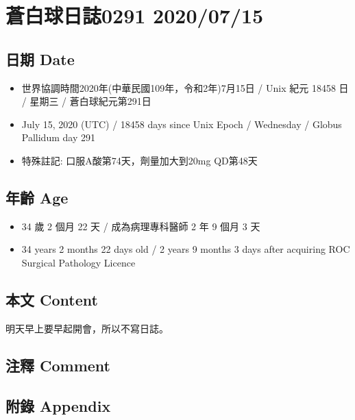 \documentclass[a5paper, 11pt
]{book}
\providecommand{\tightlist}{%
  \setlength{\itemsep}{0pt}\setlength{\parskip}{0pt}}
\begin{document}
\hypertarget{ux84bcux767dux7403ux65e5ux8a8c0291-20200715}{%
\section{蒼白球日誌0291
2020/07/15}\label{ux84bcux767dux7403ux65e5ux8a8c0291-20200715}}

\hypertarget{ux65e5ux671f-date-39}{%
\subsection{日期 Date}\label{ux65e5ux671f-date-39}}

\begin{itemize}
\tightlist
\item
  世界協調時間2020年(中華民國109年，令和2年)7月15日 / Unix 紀元 18458 日
  / 星期三 / 蒼白球紀元第291日
\item
  July 15, 2020 (UTC) / 18458 days since Unix Epoch / Wednesday / Globus
  Pallidum day 291
\item
  特殊註記: 口服A酸第74天，劑量加大到20mg QD第48天
\end{itemize}

\hypertarget{ux5e74ux9f61-age-39}{%
\subsection{年齡 Age}\label{ux5e74ux9f61-age-39}}

\begin{itemize}
\tightlist
\item
  34 歲 2 個月 22 天 / 成為病理專科醫師 2 年 9 個月 3 天
\item
  34 years 2 months 22 days old / 2 years 9 months 3 days after
  acquiring ROC Surgical Pathology Licence
\end{itemize}

\hypertarget{ux672cux6587-content-39}{%
\subsection{本文 Content}\label{ux672cux6587-content-39}}

明天早上要早起開會，所以不寫日誌。

\hypertarget{ux6ce8ux91cb-comment-39}{%
\subsection{注釋 Comment}\label{ux6ce8ux91cb-comment-39}}

\hypertarget{ux9644ux9304-appendix-39}{%
\subsection{附錄 Appendix}\label{ux9644ux9304-appendix-39}}
\end{document}
